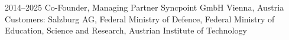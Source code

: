 \cventry
{2014--2025}
{Co-Founder, Managing Partner}
{}
{Syncpoint GmbH}
{Vienna, Austria}
{
  Customers: Salzburg AG,
  Federal Ministry of Defence,
  Federal Ministry of Education, Science and Research,
  Austrian Institute of Technology
}
